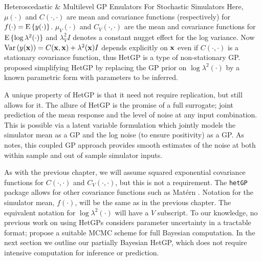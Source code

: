 \begin{chapter}{Heteroscedastic \& Multilevel GP Emulators For Stochastic Simulators\label{Ch:Hetsml}}
Here, $\mu(\cdot)$ and $C(\cdot, \cdot)$ are mean and covariance functions (respectively) for $f(\cdot) = \textrm{E}\, \{y(\cdot)\}$. $\mu_V(\cdot)$ and $C_V(\cdot, \cdot)$ are the mean and covariance functions for $\textrm{E}\,\{ \log \lambda^2(\cdot) \} $ and $\lambda_V^2 I$ denotes a constant nugget effect for the log variance. Now $\mathrm{Var}\,(y(\mathbf{x})) = C(\mathbf{x}, \mathbf{x}) + \lambda^2(\mathbf{x})I$ depends explicitly on $\mathbf{x}$ even if $C(\cdot, \cdot)$ is a stationary covariance function, thus HetGP is a type of non-stationary GP. \citet{Boukouvalas2010} proposed simplifying HetGP by replacing the GP prior on $\log \lambda^2 (\cdot)$ by a known parametric form with parameters to be inferred.

A unique property of HetGP is that it need not require replication, but still allows for it. The allure of HetGP is the promise of a full surrogate; joint prediction of the mean response and the level of noise at any input combination. This is possible via a latent variable formulation which jointly models the simulator mean as a GP and the log noise (to ensure positivity) as a GP. As \citet{Gramacy2020surrogates} notes, this coupled GP approach provides smooth estimates of the noise at both within sample and out of sample simulator inputs.

As with the previous chapter, we will assume squared exponential covariance functions for $C(\cdot, \cdot)$ and $C_V(\cdot, \cdot)$, but this is not a requirement. The \texttt{hetGP} package allows for other covariance functions such as Mat\'ern \citep{hetGP}. Notation for the simulator mean, $f(\cdot)$, will be the same as in the previous chapter. The equivalent notation for $\log \lambda^2 (\cdot)$ will have a $V$ subscript. To our knowledge, no previous work on using HetGPs considers parameter uncertainty in a tractable format; \citet{Goldberg1998} propose a suitable MCMC scheme for full Bayesian computation. In the next section we outline our partially Bayesian HetGP, which does not require intensive computation for inference or prediction.

\end{chapter}
